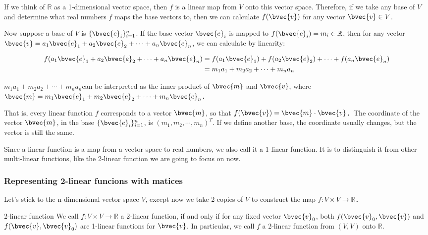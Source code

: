 If we think of $\mathbb{R}$ as a 1-dimensional vector space, then $f$ is a linear map from $V$ onto this vector space. Therefore, if we take any base of $V$ and determine what real numbers $f$ maps the base vectors to, then we can calculate $f(\bvec{v})$ for any vector $\bvec{v}\in V$. 

Now suppose a base of $V$ is $\{\bvec{e}_i\}^n_{i=1}$. If the base vector $\bvec{e}_i$ is mapped to $f(\bvec{e}_i)=m_i\in\mathbb{R}$, then for any vector $\bvec{v}=a_1\bvec{e}_1+a_2\bvec{e}_2+\cdots+a_n\bvec{e}_n$, we can calculate by linearity: 

\begin{equation}
\begin{aligned}
f(a_1\bvec{e}_1+a_2\bvec{e}_2+\cdots+a_n\bvec{e}_n)&=f(a_1\bvec{e}_1)+f(a_2\bvec{e}_2)+\cdots+f(a_n\bvec{e}_n)\\&=m_1a_1+m_2a_2+\cdots+m_na_n
\end{aligned}
\end{equation}


$m_1a_1+m_2a_2+\cdots+m_na_n$can be interpreted as the inner product of $\bvec{m}$ and $\bvec{v}$, where$\bvec{m}=m_1\bvec{e}_1+m_2\bvec{e}_2+\cdots+m_n\bvec{e}_n$．

That is, every linear function $f$ corresponds to a vector $\bvec{m}$, so that $f(\bvec{v})=\bvec{m}\cdot\bvec{v}$．The coordinate of the vector $\bvec{m}$, in the base $\{\bvec{e}_i\}_{i=1}^n$, is $(m_1, m_2, \cdots, m_n)^T$. If we define another base, the coordinate usually changes, but the vector is still the same. 

Since a linear function is a map from a vector space to real numbers, we also call it a 1-linear function. It is to distinguish it from other multi-linear functions, like the 2-linear function we are going to focus on now. 

\subsubsection{Representing 2-linear funcions with matices}

Let's stick to the n-dimensional vector space $V$, except now we take 2 copies of $V$ to construct the map $f:V\times V\rightarrow\mathbb{R}$．

\begin{definition}{2-linear function}
We call $f:V\times V\rightarrow\mathbb{R}$ a 2-linear function, if and only if for any fixed vector $\bvec{v}_0$, both $f(\bvec{v}_0, \bvec{v})$ and $f(\bvec{v}, \bvec{v}_0)$ are 1-linear functions for $\bvec{v}$. In particular, we call $f$ a 2-linear function from $(V, V)$ onto $\mathbb{R}$. 
\end{definition}

